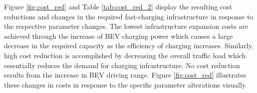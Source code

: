 Figure \ref{fig:cost_red} and Table \ref{tab:cost_red_2} display the resulting cost reductions and changes in the required fast-charging infrastructure in response to the respective parameter changes. The lowest infrastructure expansion costs are achieved through the increase of \ac{BEV} charging power which causes a large decrease in the required capacity as the efficiency of charging increases. Similarly, high cost reduction is accomplished  by decreasing the overall traffic load which essentially reduces the demand for charging infrastructure. No cost reduction results from the increase in \ac{BEV} driving range. Figure \ref{fig:cost_red} illustrates these changes in costs in response to the specific parameter alterations visually. 
\begin{table}[H]
\centering
\caption{Description of input parameter alterations reducing costs in the \textit{Gradual Development} (\textit{GD}) scenario. The parameter alterations are based on the other three scenarios: \textit{Societal Commitment} (\textit{SC}), \textit{Techno-Friendly} (\textit{TF}),  \textit{Directed Transition} (\textit{DT}). \label{tab:cost_red}}


\end{table}
